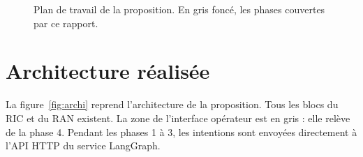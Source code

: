\documentclass[11pt,a4paper]{article}
\begin{document}
\begin{figure}[H]
\caption{Plan de travail de la proposition. En gris foncé, les phases couvertes par ce rapport.}
\label{fig:plan}
\end{figure}


\section{Architecture réalisée}

La figure~\ref{fig:archi} reprend l'architecture de la proposition. Tous les blocs du RIC et du
RAN existent. La zone de l'interface opérateur est en gris : elle relève de la phase 4. Pendant
les phases 1 à 3, les intentions sont envoyées directement à l'API HTTP du service LangGraph.
\end{document}

